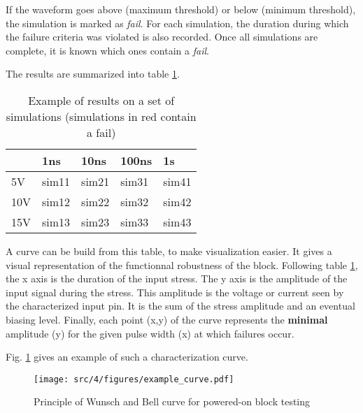 If the waveform goes above (maximum threshold) or below (minimum threshold), the simulation is marked as \textit{fail}.
For each simulation, the duration during which the failure criteria was violated is also recorded.
Once all simulations are complete, it is known which ones contain a \textit{fail}.

The results are summarized into table \ref{simulation-results}.

\begin{table}[!h]
\centering
\begin{tabular}{@{}lllll@{}}
\toprule
    & 1ns                          & 10ns                         & 100ns                        & 1\textmugreek{}s             \\ \midrule
5V  & {\color[HTML]{32CB00} sim11} & {\color[HTML]{32CB00} sim21} & {\color[HTML]{32CB00} sim31} & {\color[HTML]{FE0000} sim41} \\
10V & {\color[HTML]{32CB00} sim12} & {\color[HTML]{FE0000} sim22} & {\color[HTML]{FE0000} sim32} & {\color[HTML]{FE0000} sim42} \\
15V & {\color[HTML]{FE0000} sim13} & {\color[HTML]{FE0000} sim23} & {\color[HTML]{FE0000} sim33} & {\color[HTML]{FE0000} sim43} \\ \bottomrule
\end{tabular}
\caption{Example of results on a set of simulations (simulations in red contain a fail)}
\label{simulation-results}
\end{table}

A curve can be build from this table, to make visualization easier.
It gives a visual representation of the functionnal robustness of the block.
Following table \ref{simulation-results}, the x axis is the duration of the input stress.
The y axis is the amplitude of the input signal during the stress.
This amplitude is the voltage or current seen by the characterized input pin.
It is the sum of the stress amplitude and an eventual biasing level.
Finally, each point (x,y) of the curve represents the \textbf{minimal} amplitude (y) for the given pulse width (x) at which failures occur.

Fig. \ref{wb_cz_curve_example} gives an example of such a characterization curve.

\begin{figure}[!h]
  \centering
  \texttt{[image: src/4/figures/example\_curve.pdf]}
  \caption{Principle of Wunsch and Bell curve for powered-on block testing}
  \label{wb_cz_curve_example}
\end{figure}

